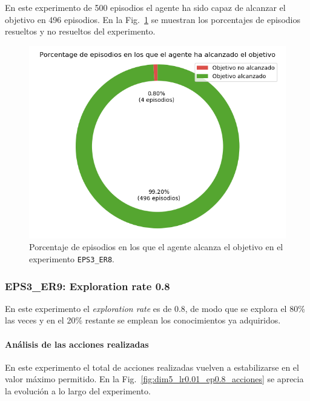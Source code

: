 En este experimento de 500 episodios el agente ha sido capaz de alcanzar el objetivo en 496 episodios. En la Fig.~\ref{fig:dim5_lr0.01_ep0.7_porcentajeResuelto} se muestran los porcentajes de episodios resueltos y no resueltos del experimento. 

\begin{figure}
    \centering
    \includegraphics[scale=0.4]{cap5_experimentacion/images/dim5_lr0.01_ep0.7_porcentajeResuelto.png}
    \caption{Porcentaje de episodios en los que el agente alcanza el objetivo en el experimento \texttt{EPS3\_ER8}.}
    \label{fig:dim5_lr0.01_ep0.7_porcentajeResuelto}
\end{figure}

\subsubsection{EPS3\_ER9: Exploration rate 0.8} \label{EPS2_ER9}

En este experimento el \textit{exploration rate} es de 0.8, de modo que se explora el 80\% las veces y en el 20\% restante se emplean los conocimientos ya adquiridos. \\

\paragraph{Análisis de las acciones realizadas}

En este experimento el total de acciones realizadas vuelven a estabilizarse en el valor máximo permitido. En la Fig.~\ref{fig:dim5_lr0.01_ep0.8_acciones} se aprecia la evolución a lo largo del experimento. \\

